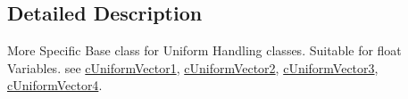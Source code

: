 \subsection{Detailed Description}
More Specific Base class for Uniform Handling classes. Suitable for float Variables. see \hyperlink{classc_uniform_vector1}{cUniformVector1}, \hyperlink{classc_uniform_vector2}{cUniformVector2}, \hyperlink{classc_uniform_vector3}{cUniformVector3}, \hyperlink{classc_uniform_vector4}{cUniformVector4}. 